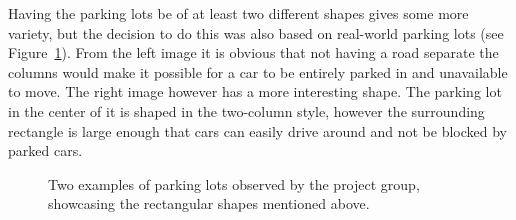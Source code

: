 Having the parking lots be of at least two different shapes gives some more variety, but the decision to do this was also based on real-world parking lots (see Figure~\ref{fig:parkings}).
From the left image it is obvious that not having a road separate the columns would make it possible for a car to be entirely parked in and unavailable to move. The right image however has a more interesting shape.
The parking lot in the center of it is shaped in the two-column style, however the surrounding rectangle is large enough that cars can easily drive around and not be blocked by parked cars. 
\begin{figure}[H]
   \centering
   \begin{subfigure}[b]{0.55\textwidth}
   \end{subfigure}
   \quad
   \begin{subfigure}[b]{0.395\textwidth}
   \end{subfigure}
   \caption{Two examples of parking lots observed by the project group, showcasing the rectangular shapes mentioned above.}
   \label{fig:parkings}
 \end{figure}









